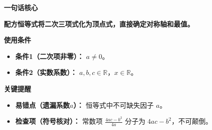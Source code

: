\begin{summarybox}
	\textbf{\textcolor{CSummary}{一句话核心}}

	\textbf{配方恒等式将二次三项式化为顶点式，直接确定对称轴和最值。}

	\medskip
	\textbf{\textcolor{CSummary}{使用条件}}
	\begin{itemize}[leftmargin=*, itemsep=0.5em, topsep=0.4em]
		\item \textbf{条件1（二次项非零）：} $a \neq 0$。
		\item \textbf{条件2（实数系数）：} $a,b,c \in \mathbb{R}$，$x \in \mathbb{R}$。
	\end{itemize}

	\medskip
	\textbf{\textcolor{CSummary}{关键提醒}}
	\begin{itemize}[leftmargin=*, itemsep=0.5em, topsep=0.4em]
		\item \textbf{易错点（遗漏系数$a$）：} 恒等式中不可缺失因子 $a$。
		\item \textbf{检查项（符号核对）：} 常数项 $\frac{4ac-b^2}{4a}$ 分子为 $4ac-b^2$，不可颠倒。
	\end{itemize}
\end{summarybox}
